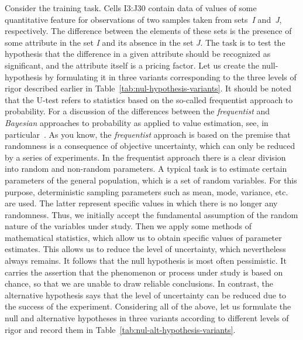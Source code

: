 \documentclass[]{scrreprt}
\begin{document}
Consider the training task. Cells I3:J30 contain data of values of some quantitative feature for observations of two samples taken from sets~\textit{I} and~\textit{J}, respectively. The difference between the elements of these sets is the presence of some attribute in the set \textit{I} and its absence in the set \textit{J}. The task is to test the hypothesis that the difference in a given attribute should be recognized as significant, and the attribute itself is a pricing factor. Let us create the null-hypothesis by formulating it in three variants corresponding to the three levels of rigor described earlier in Table~\ref{tab:nul-hypothesis-variants}. It should be noted that the U-test refers to statistics based on the so-called frequentist approach to probability. For a discussion of the differences between the \emph{frequentist} and \emph{Bayesian} approaches to probability as applied to value estimation, see, in particular~\cite{Murashev:freq-baye-prob}. As you know, the \emph{frequentist} approach is based on the premise that randomness is a consequence of objective uncertainty, which can only be reduced by a series of experiments. In the frequentist approach there is a clear division into random and non-random parameters. A typical task is to estimate certain parameters of the general population, which is a set of random variables. For this purpose, deterministic sampling parameters such as mean, mode, variance, etc. are used. The latter represent specific values in which there is no longer any randomness. Thus, we initially accept the fundamental assumption of the random nature of the variables under study. Then we apply some methods of mathematical statistics, which allow us to obtain specific values of parameter estimates. This allows us to reduce the level of uncertainty, which nevertheless always remains. It follows that the null hypothesis is most often pessimistic. It carries the assertion that the phenomenon or process under study is based on chance, so that we are unable to draw reliable conclusions. In contrast, the alternative hypothesis says that the level of uncertainty can be reduced due to the success of the experiment. Considering all of the above, let us formulate the null and alternative hypotheses in three variants according to different levels of rigor and record them in Table~\ref{tab:nul-alt-hypothesis-variants}.
%
\end{document}
